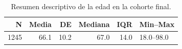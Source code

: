 \begin{table}[H]
\centering
\begin{tabular}{rrrrrl}
\toprule
N & Media & DE & Mediana & IQR & Min--Max \\
\midrule
1245 & 66.1 & 10.2 & 67.0 & 14.0 & 18.0--98.0 \\
\bottomrule
\end{tabular}
\caption{Resumen descriptivo de la edad en la cohorte final.}
\label{tab:age_summary}
\end{table}
